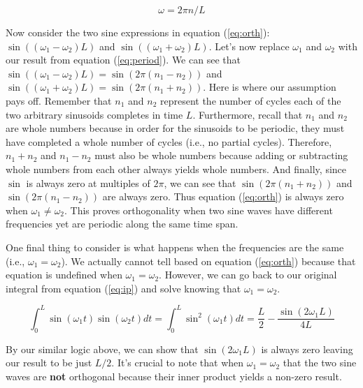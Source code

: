 	\begin{equation}
		\label{eq:period}
		\omega = 2\pi n/L
	\end{equation}
	
	Now consider the two sine expressions in equation (\ref{eq:orth}): $\sin((\omega_1 - \omega_2)L)$ and 
	$\sin((\omega_1 + \omega_2)L)$.  Let's now replace $\omega_1$ and $\omega_2$ with our result from equation
	(\ref{eq:period}).  We can see that $\sin((\omega_1 - \omega_2)L) = \sin(2\pi(n_1 - n_2))$ and 
	$\sin((\omega_1 + \omega_2)L) = \sin(2\pi(n_1 + n_2))$.  Here is where our assumption pays off.  Remember
	that $n_1$ and $n_2$ represent the number of cycles each of the two arbitrary sinusoids completes in time $L$.
	Furthermore, recall that $n_1$ and $n_2$ are whole numbers because in order for the sinusoids to be periodic, 
	they must have completed a whole number of cycles (i.e., no partial cycles).  Therefore, $n_1 + n_2$ and $n_1 - n_2$ 
	must also be whole numbers because adding or subtracting whole numbers from each other always yields whole
	numbers.  And finally, since $\sin$ is always zero at multiples of $2\pi$, we can see that $\sin(2\pi(n_1 + n_2))$
	and $\sin(2\pi(n_1 - n_2))$ are always zero.  Thus equation (\ref{eq:orth}) is always zero when $\omega_1 \neq
	\omega_2$.  This proves orthogonality when two sine waves have different frequencies yet are periodic along the
	same time span.  
	
	One final thing to consider is what happens when the frequencies are the same (i.e., $\omega_1 = \omega_2$).  We
	actually cannot tell based on equation (\ref{eq:orth}) because that equation is undefined when 
	$\omega_1 = \omega_2$.  However, we can go back to our original integral from equation (\ref{eq:ip}) and solve
	knowing that $\omega_1 = \omega_2$.  
	
	\begin{equation}
	\int_{0}^{L}\sin(\omega_1 t)\sin(\omega_2 t)dt = \int_{0}^{L}\sin^2(\omega_1 t)dt = \frac{L}{2} - \frac{\sin(2\omega_1 L)}{4 L}
	\end{equation}
	
	By our similar logic above, we can show that $\sin(2\omega_1 L)$ is always zero leaving our result to be just
	$L/2$.  It's crucial to note that when $\omega_1 = \omega_2$ that the two sine waves are \textbf{not} orthogonal
	because their inner product yields a non-zero result.
	

